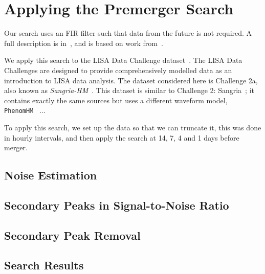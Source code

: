 \section{Applying the Premerger Search}
\label{sec:fir_sangria}

Our search uses an \ac{FIR} filter such that data from the future is not required. A full
description is in~\cite{CabournDavies:2024hea}, and is based on work from~\cite{Tsukada:2017cuf}.

We apply this search to the LISA Data Challenge dataset~\cite{Baghi:2022ucj, LDC_WEBSITE}.
The LISA Data Challenges are designed to provide comprehensively modelled data as an introduction
to LISA data analysis. The dataset considered here is Challenge 2a, also known as
\textit{Sangria-HM}~\cite{LDC_WEBSITE_SANGRIA_HM}.
This dataset is similar to Challenge 2: Sangria~\cite{LDC_WEBSITE_SANGRIA, le_jeune_2022_7132178};
it contains exactly the same sources but uses a different waveform model, \texttt{PhenomHM}~\cite{}
... 

To apply this search, we set up the data so that we can truncate it, this was done in hourly intervals,
and then apply the search at 14, 7, 4 and 1 days before merger.

\subsection{Noise Estimation}
\label{subsec:psds}

\subsection{Secondary Peaks in Signal-to-Noise Ratio}
\label{subsec:double_peaks}

\subsection{Secondary Peak Removal}
\label{subsec:peak_removal}

\subsection{Search Results}
\label{subsec:fir_results}
